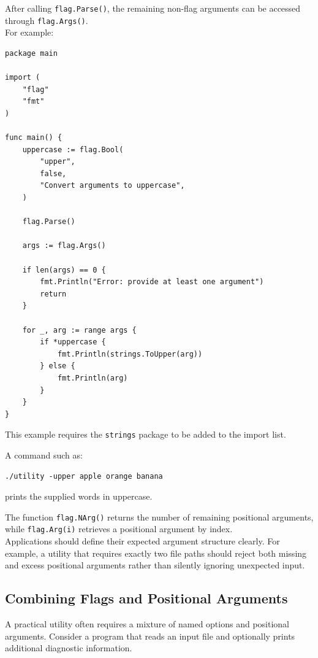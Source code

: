 After calling \texttt{flag.Parse()}, the remaining non-flag arguments can be accessed through \texttt{flag.Args()}.\\

For example:

\begin{lstlisting}
package main

import (
    "flag"
    "fmt"
)

func main() {
    uppercase := flag.Bool(
        "upper",
        false,
        "Convert arguments to uppercase",
    )

    flag.Parse()

    args := flag.Args()

    if len(args) == 0 {
        fmt.Println("Error: provide at least one argument")
        return
    }

    for _, arg := range args {
        if *uppercase {
            fmt.Println(strings.ToUpper(arg))
        } else {
            fmt.Println(arg)
        }
    }
}
\end{lstlisting}

This example requires the \texttt{strings} package to be added to the import list.

A command such as:

\begin{lstlisting}
./utility -upper apple orange banana
\end{lstlisting}

prints the supplied words in uppercase.

The function \texttt{flag.NArg()} returns the number of remaining positional arguments, while \texttt{flag.Arg(i)} retrieves a positional argument by index.\\

Applications should define their expected argument structure clearly. For example, a utility that requires exactly two file paths should reject both missing and excess positional arguments rather than silently ignoring unexpected input.\\

\subsection{Combining Flags and Positional Arguments}

A practical utility often requires a mixture of named options and positional arguments. Consider a program that reads an input file and optionally prints additional diagnostic information.\\

